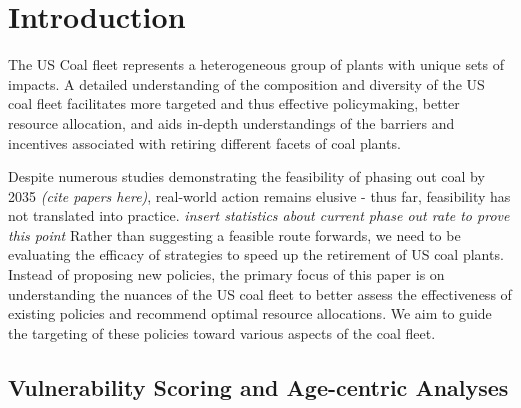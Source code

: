 \setlength{\parindent}{20pt}


\section{Introduction}

The US Coal fleet represents a heterogeneous group of plants with unique sets of impacts. A detailed understanding of the composition and
diversity of the US coal fleet facilitates more targeted and thus effective policymaking, better resource allocation, and aids in-depth
understandings of the barriers and incentives associated with retiring different facets of coal plants.

Despite numerous studies demonstrating the feasibility of phasing out coal by 2035 \textit{(cite papers here)}, 
real-world action remains elusive - thus far, feasibility has not translated into practice. \textit{insert statistics about current phase out rate to prove this point} 
Rather than suggesting a feasible route forwards, we need to be evaluating the efficacy of strategies to speed up the retirement of US coal plants. 
Instead of proposing new policies, the primary focus of this paper is on understanding the nuances of the US coal fleet to better assess the effectiveness 
of existing policies and recommend optimal resource allocations. We aim to guide the targeting of these policies toward various aspects of the coal fleet.


\subsection{Vulnerability Scoring and Age-centric Analyses}

